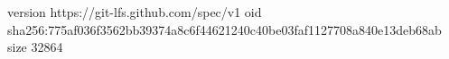 version https://git-lfs.github.com/spec/v1
oid sha256:775af036f3562bb39374a8c6f44621240c40be03faf1127708a840e13deb68ab
size 32864
